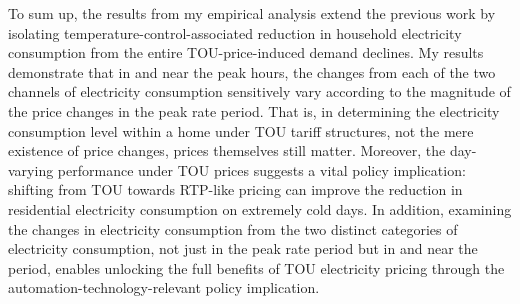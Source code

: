 To sum up, the results from my empirical analysis extend the previous work by isolating temperature-control-associated reduction in household electricity consumption from the entire TOU-price-induced demand declines. My results demonstrate that in and near the peak hours, the changes from each of the two channels of electricity consumption sensitively vary according to the magnitude of the price changes in the peak rate period. That is, in determining the electricity consumption level within a home under TOU tariff structures, not the mere existence of price changes, prices themselves still matter. Moreover, the day-varying performance under TOU prices suggests a vital policy implication: shifting from TOU towards RTP-like pricing can improve the reduction in residential electricity consumption on extremely cold days. In addition, examining the changes in electricity consumption from the two distinct categories of electricity consumption, not just in the peak rate period but in and near the period, enables unlocking the full benefits of TOU electricity pricing through the automation-technology-relevant policy implication.
